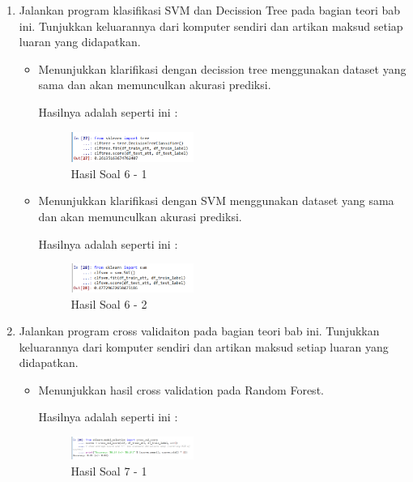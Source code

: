 \begin{enumerate}
\begin{itemize}
\end{itemize}


\item Jalankan program klasifikasi SVM dan Decission Tree pada bagian teori bab ini. Tunjukkan keluarannya dari komputer sendiri dan artikan maksud setiap luaran yang didapatkan.
	\hfill\break
\begin{itemize}
	\item Menunjukkan klarifikasi dengan decission tree menggunakan dataset yang sama dan akan memunculkan akurasi prediksi.
	
	Hasilnya adalah seperti ini :

	\begin{figure}[H]
	\centering
		\includegraphics[width=4cm]{figures/1174086/3/soal61.PNG}
		\caption{Hasil Soal 6 - 1}
	\end{figure}

	\item Menunjukkan klarifikasi dengan SVM menggunakan dataset yang sama dan akan memunculkan akurasi prediksi.
	
	Hasilnya adalah seperti ini :

	\begin{figure}[H]
	\centering
		\includegraphics[width=4cm]{figures/1174086/3/soal62.PNG}
		\caption{Hasil Soal 6 - 2}
	\end{figure}
\end{itemize}


\item Jalankan program cross validaiton pada bagian teori bab ini. Tunjukkan keluarannya dari komputer sendiri dan artikan maksud setiap luaran yang didapatkan.
	\hfill\break
\begin{itemize}
	\item Menunjukkan hasil cross validation pada Random Forest.
	
	Hasilnya adalah seperti ini :

	\begin{figure}[H]
	\centering
		\includegraphics[width=4cm]{figures/1174086/3/soal71.PNG}
		\caption{Hasil Soal 7 - 1}
	\end{figure}


\end{itemize}
\end{enumerate}
